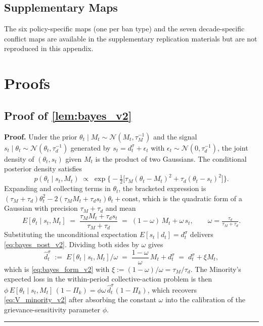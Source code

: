 \documentclass[11pt,twoside]{extarticle}
\newenvironment{proof}[1][Proof]{\noindent \textbf{#1.} }{\ \rule{0.5em}{0.5em}}
\begin{document}
\subsection{Supplementary Maps} \label{app:supplementary_maps}

The six policy-specific maps (one per ban type) and the seven decade-specific
conflict maps are available in the supplementary replication materials but are not reproduced in this appendix.



\section{Proofs} \label{app:proofs_v2}

\subsection*{Proof of \autoref{lem:bayes_v2}} \label{app:proof:bayes_v2}

\begin{proof}
Under the prior $\theta_t\mid M_t\sim\mathcal{N}(M_t,\tau_M^{-1})$ and the
signal $s_t\mid\theta_t\sim\mathcal{N}(\theta_t,\tau_d^{-1})$ generated
by $s_t=d_t^\sigma+\epsilon_t$ with $\epsilon_t\sim\mathcal{N}(0,\tau_d^{-1})$,
the joint density of $(\theta_t,s_t)$ given $M_t$ is the product of two
Gaussians. The conditional posterior density satisfies
\[
p(\theta_t\mid s_t,M_t)\;\propto\;\exp\!\Big\{-\tfrac{1}{2}\big[\tau_M(\theta_t-M_t)^2+\tau_d(\theta_t-s_t)^2\big]\Big\}.
\]
Expanding and collecting terms in $\theta_t$, the bracketed expression is
$(\tau_M+\tau_d)\theta_t^2-2(\tau_M M_t+\tau_d s_t)\theta_t+\text{const}$,
which is the quadratic form of a Gaussian with precision $\tau_M+\tau_d$
and mean
\[
E[\theta_t\mid s_t,M_t]\;=\;\frac{\tau_M M_t+\tau_d s_t}{\tau_M+\tau_d}\;=\;(1-\omega)\,M_t+\omega\,s_t,\qquad \omega=\tfrac{\tau_d}{\tau_M+\tau_d}.
\]
Substituting the unconditional expectation $E[s_t\mid d_t]=d_t^\sigma$
delivers \autoref{eq:bayes_post_v2}. Dividing both sides by $\omega$ gives
\[
\hat d_t^\sigma\;:=\;E[\theta_t\mid s_t,M_t]/\omega\;=\;\frac{1-\omega}{\omega}\,M_t+d_t^\sigma\;=\;d_t^\sigma+\xi M_t,
\]
which is \autoref{eq:bayes_form_v2} with $\xi:=(1-\omega)/\omega=\tau_M/\tau_d$. The Minority's
expected loss in the within-period collective-action problem is then
$\phi\,E[\theta_t\mid s_t,M_t]\,(1-\Pi_k)=\phi\omega\,\hat d_t^\sigma(1-\Pi_k)$,
which recovers \autoref{eq:V_minority_v2} after absorbing the constant $\omega$
into the calibration of the grievance-sensitivity parameter $\phi$.
\end{proof}
\end{document}
